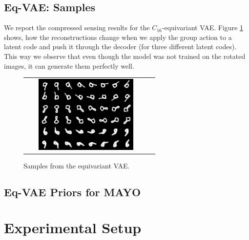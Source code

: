 \subsection{Eq-VAE: Samples}\label{appx:eq_vae_group_sample}
We report the compressed sensing results for the $C_{16}$-equivariant VAE. Figure \ref{fig:vae_prior_samples} shows, how the reconstructions change when we apply the group action to a latent code and push it through the decoder (for three different latent codes). This way we observe that even though the model was not trained on the rotated images, it can generate them perfectly well.
\begin{figure}[h]
    \centering
    \begin{tabular}{cc}
        \includegraphics[width=0.8\textwidth]{pics/2_equiv_vae/mnist_reconstruction_full_covariance_non-cs.png} 
    \end{tabular}
    \caption{Samples from the equivariant VAE.}
    \label{fig:vae_prior_samples}
\end{figure}


\newpage
\subsection{Eq-VAE Priors for MAYO}\label{appx:eq_vae}






\newpage
\section{Experimental Setup}\label{appx:exp_setup}

